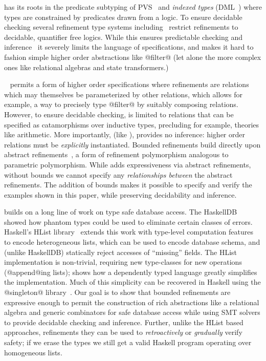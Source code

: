 %
has its roots in the predicate subtyping
of PVS~\cite{Rushby98} and \emph{indexed types}
(DML~\cite{pfenningxi98}) where types are constrained
by predicates drawn from a logic.
%
To ensure decidable checking several refinement
type systems including~\citep{pfenningxi98,Dunfield07,LiquidICFP14}
restrict refinements to decidable, quantifier free logics.
%
While this ensures predictable checking and inference~\cite{LiquidPLDI08}
it severely limits the language of specifications, and makes it hard to
fashion simple higher order abstractions like @filter@ (let alone the more
complex ones like relational algebras and state transformers.)

%
\catalyst~\citep{catalyst} permits a form of
higher order specifications where refinements
are relations which may themselves be parameterized
by other relations, which allows for example, a
way to precisely type @filter@ by suitably
composing relations.
%
However, to ensure decidable checking, \catalyst
is limited to relations that can be specified as
catamorphisms over inductive types, precluding
for example, theories like arithmetic.
More importantly, (like \fstar), \catalyst provides
no inference: higher order relations must be
\emph{explicitly} instantiated.
%
Bounded refinements build directly upon
abstract refinements~\citep{vazou13},
a form of refinement polymorphism
analogous to parametric polymorphism.
%
While \cite{vazou13} adds expressiveness via
abstract refinements, without bounds we cannot
specify any \emph{relationships between} the
abstract refinements. The addition of bounds
makes it possible to specify and verify the examples
shown in this paper,
while preserving decidability and inference.

 builds on a long
line of work on type safe database access.
%
The HaskellDB~\citep{haskellDB}
showed how phantom types could be used to eliminate
certain classes of errors.
%
Haskell's HList library~\citep{heterogeneous}
extends this work with type-level computation
features to encode heterogeneous lists, which
can be used to encode database schema, and
(unlike HaskellDB) statically reject accesses
of ``missing'' fields.
%
The HList implementation is non-trivial,
requiring new type-classes for new operations
(\eg @append@ing lists); \citep{thepipower}
shows how a dependently typed language greatly
simplifies the implementation.
%
Much of this simplicity can be recovered in
Haskell using the @singleton@ library~\citep{Weirich12}.
%
Our goal is to show that bounded refinements
are expressive enough to permit the construction
of rich abstractions like a relational algebra
and generic combinators for safe database access
while using SMT solvers to provide decidable
checking and inference. Further, unlike the
HList based approaches, refinements they can
be used to \emph{retroactively} or \emph{gradually}
verify safety; if we erase the types we still
get a valid Haskell program operating over
homogeneous lists.


